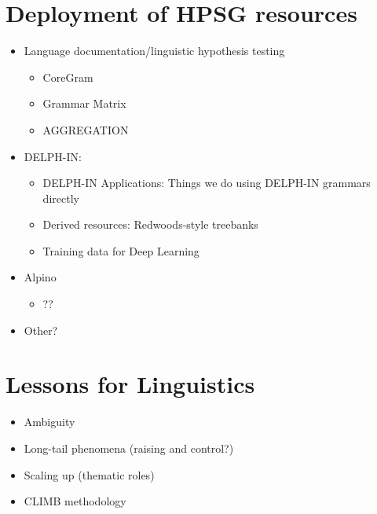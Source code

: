 \documentclass[output=paper]{langsci/langscibook}
\begin{document}




\section{Deployment of HPSG resources}


\begin{itemize}
 \item Language documentation/linguistic hypothesis testing
    \begin{itemize}
    \item CoreGram %
    \item Grammar Matrix %
    \item AGGREGATION %
    \end{itemize}
 \item DELPH-IN:
    \begin{itemize}
    \item DELPH-IN Applications: Things we do using DELPH-IN grammars directly %
    \item Derived resources: Redwoods-style treebanks %
    \item Training data for Deep Learning %
    \end{itemize}
 \item Alpino %
    \begin{itemize}
    \item ??
    \end{itemize}
 \item Other?
 \end{itemize}

\section{Lessons for Linguistics}
\begin{itemize}
    \item Ambiguity %
    \item Long-tail phenomena (raising and control?) %
    \item Scaling up (thematic roles) %
    \item CLIMB methodology %
\end{itemize}
\end{document}
